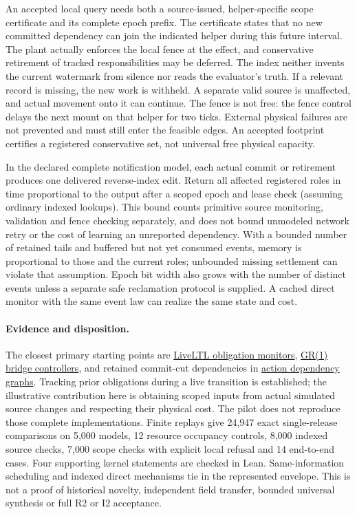 \documentclass[11pt]{article}
\begin{document}
An accepted local query needs both a source-issued, helper-specific
scope certificate and its complete epoch prefix. The certificate
states that no new committed dependency can join the indicated
helper during this future interval. The plant actually enforces
the local fence at the effect, and conservative retirement of tracked
responsibilities may be deferred. The index neither invents the
current watermark from silence nor reads the evaluator's truth.
If a relevant record is missing, the new work is withheld. A
separate valid source is unaffected, and actual movement onto it can
continue. The fence is not free: the fence control
delays the next mount on that helper for two ticks. External physical
failures are not prevented and must still enter the feasible edges.
An accepted footprint certifies a registered conservative set, not
universal free physical capacity.

In the declared complete notification model, each actual commit or
retirement produces one delivered reverse-index edit. Return all
affected registered roles in time proportional to the output after
a scoped epoch and lease check (assuming ordinary indexed lookups).
This bound counts primitive source monitoring, validation and fence
checking separately, and does not bound unmodeled network retry or
the cost of learning an unreported dependency. With a bounded number
of retained tails and buffered but not yet consumed events, memory
is proportional to those and the current roles; unbounded missing
settlement can violate that assumption. Epoch bit width also grows
with the number of distinct events unless a separate safe reclamation
protocol is supplied. A cached direct monitor with the same event
law can realize the same state and cost.

\paragraph{Evidence and disposition.}
The closest primary starting points are
\href{https://pmc.ncbi.nlm.nih.gov/articles/PMC9468080/}{LiveLTL obligation monitors},
\href{https://conf.researchr.org/details/icse-2022/icse-2022-papers/18/Dynamic-Update-for-Synthesized-GR-1-Controllers}{GR(1) bridge controllers}, and retained commit-cut dependencies in
\href{https://whoenig.github.io/publications/2019_RA-L_Hoenig.pdf}{action dependency graphs}.
Tracking prior obligations during a live transition is established;
the illustrative contribution here is obtaining scoped inputs
from actual simulated source changes and respecting their physical
cost. The pilot does not reproduce those complete implementations.
Finite replays give 24,947 exact single-release comparisons on
5,000 models, 12 resource occupancy controls, 8,000 indexed source
checks, 7,000 scope checks with explicit local refusal and 14
end-to-end cases. Four supporting kernel statements are checked in Lean.
Same-information scheduling and indexed direct mechanisms tie in
the represented envelope. This is not a proof of historical novelty,
independent field transfer, bounded universal synthesis or full R2
or I2 acceptance.
\end{document}
